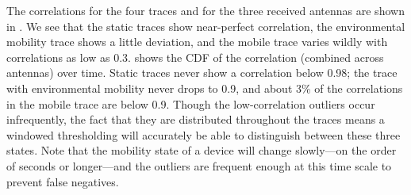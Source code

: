 The correlations for the four traces and for the three received antennas are shown in . We see that the static traces show near-perfect correlation, the environmental mobility trace shows a little deviation, and the mobile trace varies wildly with correlations as low as 0.3.  shows the CDF of the correlation (combined across antennas) over time. Static traces never show a correlation below 0.98; the trace with environmental mobility never drops to 0.9, and about 3\% of the correlations in the mobile trace are below 0.9. Though the low-correlation outliers occur infrequently, the fact that they are distributed throughout the traces means a windowed thresholding will accurately be able to distinguish between these three states. Note that the mobility state of a device will change slowly---on the order of seconds or longer---and the outliers are frequent enough at this time scale to prevent false negatives.


